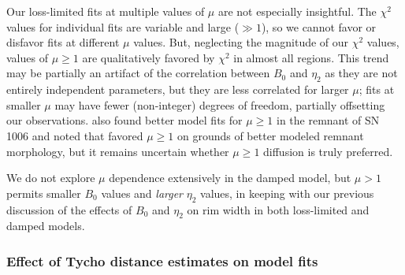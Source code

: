\documentclass[iop, apj, numberedappendix]{emulateapj}
\begin{document}
Our loss-limited fits at multiple values of $\mu$ are not especially
insightful.  The $\chi^2$ values for individual fits are variable and large
($\gg 1$), so we cannot favor or disfavor fits at different $\mu$ values.  But,
neglecting the magnitude of our $\chi^2$ values, values of $\mu \geq 1$ are
qualitatively favored by $\chi^2$ in almost all regions.  This trend may be
partially an artifact of the correlation between $B_0$ and $\eta_2$ as they are
not entirely independent parameters, but they are less correlated for larger
$\mu$; fits at smaller $\mu$ may have fewer (non-integer) degrees of freedom,
partially offsetting our observations.   also found
better model fits for $\mu \geq 1$ in the remnant of SN 1006 and noted that
\citet{reynolds2004} favored $\mu \geq 1$ on grounds of better modeled remnant
morphology, but it remains uncertain whether $\mu \geq 1$ diffusion is truly
preferred.

We do not explore $\mu$ dependence extensively in the damped model, but
$\mu > 1$ permits smaller $B_0$ values and \emph{larger} $\eta_2$ values, in
keeping with our previous discussion of the effects of $B_0$ and $\eta_2$ on
rim width in both loss-limited and damped models.

\subsubsection{Effect of Tycho distance estimates on model fits}
\end{document}
